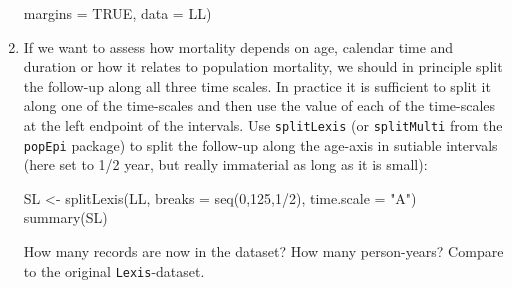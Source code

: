 \begin{enumerate}
\begin{Schunk}
\begin{Sinput}
            margins = TRUE,
            data = LL)
\end{Sinput}
\end{Schunk}
\item If we want to assess how mortality depends on age, calendar time
  and duration or how it relates to population mortality, we should
  in principle split the follow-up along all
  three time scales. In practice it is sufficient to split it along
  one of the time-scales and then use the value of each of the
  time-scales at the left endpoint of the intervals.
  Use \texttt{splitLexis} (or \texttt{splitMulti} from the
  \texttt{popEpi} package) to split the follow-up along the
  age-axis in sutiable intervals (here set to 1/2 year, but really
  immaterial as long as it is small):
\begin{Schunk}
\begin{Sinput}
 SL <- splitLexis(LL, breaks = seq(0,125,1/2), time.scale = "A")
 summary(SL)
\end{Sinput}
\end{Schunk}
  How many records are now in the dataset? How many person-years?
  Compare to the original \texttt{Lexis}-dataset.
\end{enumerate}
